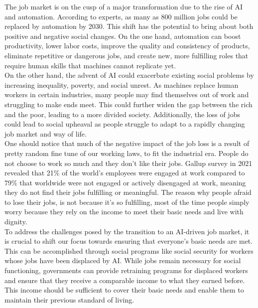 \documentclass{article}
\begin{document}
The job market is on the cusp of a major transformation due to the rise of AI and automation. According to experts, as many as 800 million jobs could be replaced by automation by 2030\cite{szabo2021impact}. This shift has the potential to bring about both positive and negative social changes. On the one hand, automation can boost productivity, lower labor costs, improve the quality and consistency of products, eliminate repetitive or dangerous jobs, and create new, more fulfilling roles that require human skills that machines cannot replicate yet\cite{vacek2017road}.\\

On the other hand, the advent of AI could exacerbate existing social problems by increasing inequality, poverty, and social unrest. As machines replace human workers in certain industries, many people may find themselves out of work and struggling to make ends meet. This could further widen the gap between the rich and the poor, leading to a more divided society. Additionally, the loss of jobs could lead to social upheaval as people struggle to adapt to a rapidly changing job market and way of life\cite{pereira2020industry}. \\

One should notice that much of the negative impact of the job loss is a result of pretty random fine tune of our working laws, to fit the industrial era\cite{roberts2021workforce}. People do not choose to work so much and they don't like their jobs. Gallup survey in 2021 revealed that 21\% of the world's employees were engaged at work\cite{pendell2022world} compared to 79\% that worldwide were not engaged or actively disengaged at work, meaning they do not find their jobs fulfilling or meaningful. The reason why people afraid to lose their jobs, is not because it's so fulfilling, most of the time people simply worry because they rely on the income to meet their basic needs and live with dignity.\\

To address the challenges posed by the transition to an AI-driven job market, it is crucial to shift our focus towards ensuring that everyone's basic needs are met. This can be accomplished through social programs like social security for workers whose jobs have been displaced by AI. While jobs remain necessary for social functioning, governments can provide retraining programs for displaced workers and ensure that they receive a comparable income to what they earned before. This income should be sufficient to cover their basic needs and enable them to maintain their previous standard of living.\\
\end{document}
